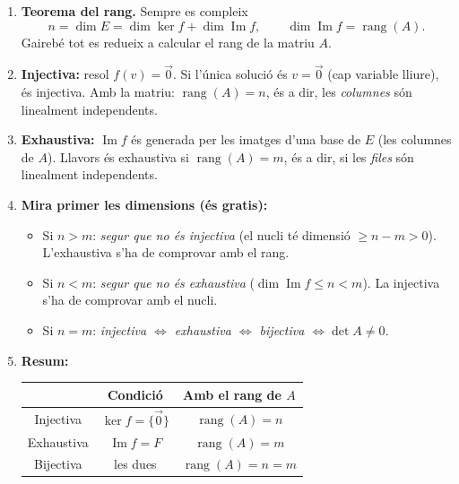\documentclass[12pt]{article}
\begin{document}
\begin{enumerate}
    \item \textbf{Teorema del rang.} Sempre es compleix
    \[
        n=\dim E=\dim\ker f+\dim\operatorname{Im} f ,
        \qquad \dim\operatorname{Im} f=\operatorname{rang}(A).
    \]
    Gairebé tot es redueix a calcular el rang de la matriu $A$.
 
    \item \textbf{Injectiva:} resol $f(v)=\vec{0}$. Si l'única solució és $v=\vec{0}$
    (cap variable lliure), és injectiva. Amb la matriu: $\operatorname{rang}(A)=n$, és
    a dir, les \emph{columnes} són linealment independents.
 
    \item \textbf{Exhaustiva:} $\operatorname{Im} f$ és generada per les imatges d'una base
    de $E$ (les columnes de $A$). Llavors és exhaustiva si
    $\operatorname{rang}(A)=m$, és a dir, si les \emph{files} són linealment independents.
 
    \item \textbf{Mira primer les dimensions (és gratis):}
    \begin{itemize}
        \item Si $n>m$: \emph{segur que no és injectiva} (el nucli té dimensió
        $\ge n-m>0$). L'exhaustiva s'ha de comprovar amb el rang.
        \item Si $n<m$: \emph{segur que no és exhaustiva}
        ($\dim\operatorname{Im} f\le n<m$). La injectiva s'ha de comprovar amb el nucli.
        \item Si $n=m$: \emph{injectiva $\iff$ exhaustiva $\iff$ bijectiva
        $\iff\det A\neq0$.}
    \end{itemize}
 
    \item \textbf{Resum:}
    \begin{center}
    \renewcommand{\arraystretch}{1.4}
    \begin{tabular}{|c|c|c|}
    \hline
     & \textbf{Condició} & \textbf{Amb el rang de $A$}\\
    \hline
    Injectiva & $\ker f=\{\vec{0}\}$ & $\operatorname{rang}(A)=n$\\
    \hline
    Exhaustiva & $\operatorname{Im} f=F$ & $\operatorname{rang}(A)=m$\\
    \hline
    Bijectiva & les dues & $\operatorname{rang}(A)=n=m$\\
    \hline
    \end{tabular}
    \end{center}
\end{enumerate}
\end{document}
